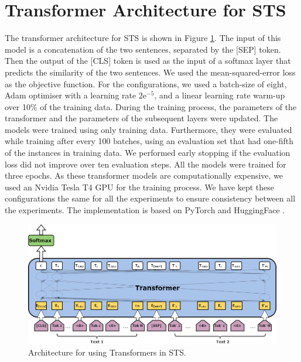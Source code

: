 \section{Transformer Architecture for STS}
\label{sec:transformer_method}

The transformer architecture for STS is shown in Figure \ref{fig:sts_transformers}. The input of this model is a concatenation of the two sentences, separated by the \textsc{[SEP]} token. Then the output of the \textsc{[CLS]} token is used as the input of a softmax layer that predicts the similarity of the two sentences. We used the mean-squared-error loss as the objective function. For the configurations, we used a batch-size of eight, Adam optimiser with a learning rate $2\mathrm{e}^{-5}$, and a linear learning rate warm-up over 10\% of the training data. During the training process, the parameters of the transformer and the parameters of the subsequent layers were updated. The models were trained using only training data. Furthermore, they were evaluated while training after every 100 batches, using an evaluation set that had one-fifth of the instances in training data. We performed early stopping if the evaluation loss did not improve over ten evaluation steps. All the models were trained for three epochs. As these transformer models are computationally expensive, we used an Nvidia Tesla T4 GPU for the training process. We have kept these configurations the same for all the experiments to ensure consistency between all the experiments. The implementation is based on PyTorch \autocite{NEURIPS2019_9015} and HuggingFace \autocite{wolf-etal-2020-transformers}.

\begin{figure}[ht]
	\centering
	\includegraphics[scale=0.4]{figures/semantic_textual_similarity/transformers/STSTransformers.png}
	\caption[Architecture for using Transformers in STS]{Architecture for using Transformers in STS.}
	\label{fig:sts_transformers}
\end{figure}

